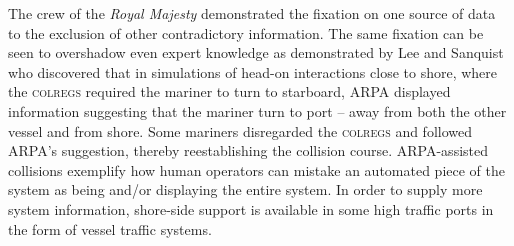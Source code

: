 \documentclass[twoside,symmetric,notoc]{tufte-book}
\begin{document}
\par{%
The crew of the \textit{Royal Majesty} demonstrated the fixation on one source of data to the exclusion of other contradictory information. The same fixation can be seen to overshadow even expert knowledge as demonstrated by Lee and Sanquist who discovered that in simulations of head-on interactions close to shore, where the \textsc{colregs} required the mariner to turn to starboard, ARPA displayed information suggesting that the mariner turn to port -- away from both the other vessel and from shore. Some mariners disregarded the \textsc{colregs} and followed ARPA's suggestion, thereby reestablishing the collision course.\cite[-0.75in]{Lee} ARPA-assisted collisions exemplify how human operators can mistake an automated piece of the system as being and/or displaying the entire system. In order to supply more system information, shore-side support is available in some high traffic ports in the form of vessel traffic systems.
}
\end{document}

